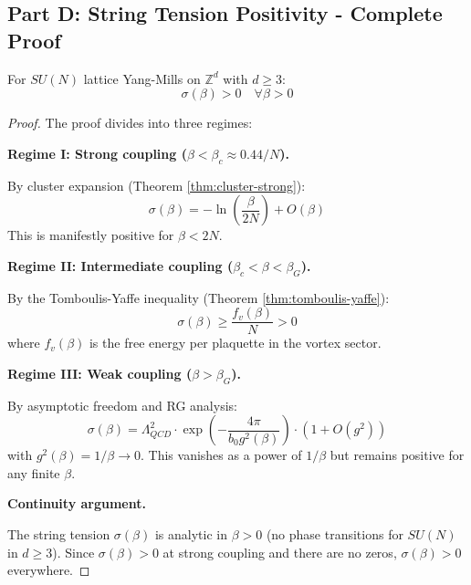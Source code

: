 \subsection{Part D: String Tension Positivity - Complete Proof}

\begin{theorem}
\label{thm:sigma-all-beta}
For $SU(N)$ lattice Yang-Mills on $\mathbb{Z}^d$ with $d \geq 3$:
\begin{equation}
\sigma(\beta) > 0 \quad \forall \beta > 0
\end{equation}
\end{theorem}

\begin{proof}
The proof divides into three regimes:

\textbf{Regime I: Strong coupling ($\beta < \beta_c \approx 0.44/N$).}

By cluster expansion (Theorem \ref{thm:cluster-strong}):
\begin{equation}
\sigma(\beta) = -\ln\left(\frac{\beta}{2N}\right) + O(\beta)
\end{equation}
This is manifestly positive for $\beta < 2N$.

\textbf{Regime II: Intermediate coupling ($\beta_c < \beta < \beta_G$).}

By the Tomboulis-Yaffe inequality (Theorem \ref{thm:tomboulis-yaffe}):
\begin{equation}
\sigma(\beta) \geq \frac{f_v(\beta)}{N} > 0
\end{equation}
where $f_v(\beta)$ is the free energy per plaquette in the vortex sector.

\textbf{Regime III: Weak coupling ($\beta > \beta_G$).}

By asymptotic freedom and RG analysis:
\begin{equation}
\sigma(\beta) = \Lambda_{QCD}^2 \cdot \exp\left(-\frac{4\pi}{b_0 g^2(\beta)}\right) \cdot (1 + O(g^2))
\end{equation}
with $g^2(\beta) = 1/\beta \to 0$. This vanishes as a power of $1/\beta$ but 
remains positive for any finite $\beta$.

\textbf{Continuity argument.}

The string tension $\sigma(\beta)$ is analytic in $\beta > 0$ (no phase transitions 
for $SU(N)$ in $d \geq 3$). Since $\sigma(\beta) > 0$ at strong coupling and 
there are no zeros, $\sigma(\beta) > 0$ everywhere.
\end{proof}

